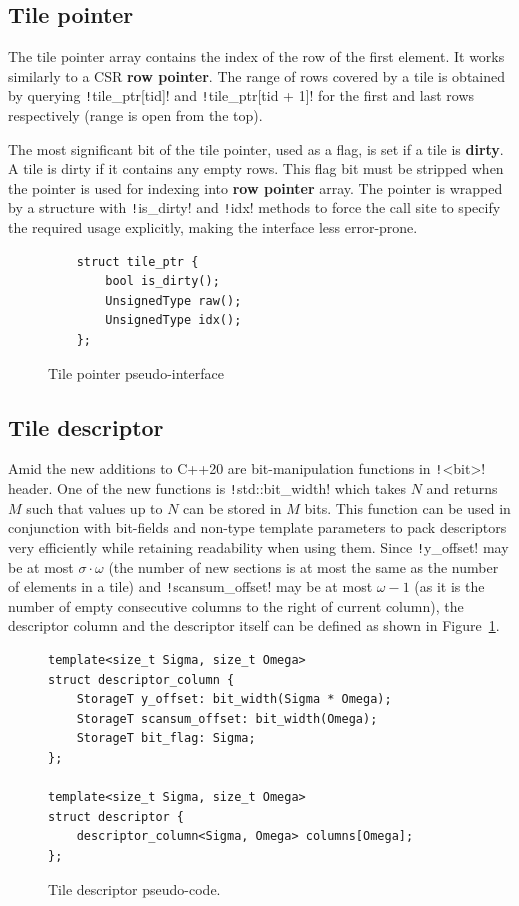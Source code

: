 \documentclass[thesis=M,english]{FITthesis}[2019/12/23]
\newcommand{\csre}[1]{\texttt!#1!}
\begin{document}
\subsection{Tile pointer}

The tile pointer array contains the index of the row of the first element. It works similarly to a CSR
\textbf{row pointer}. The range of rows covered by a tile is obtained by querying \csre{tile_ptr[tid]}
and \csre{tile_ptr[tid + 1]} for the first and last rows respectively (range is open from the top).

The most significant bit of the tile pointer, used as a flag, is set if a tile is \textbf{dirty}.
A tile is dirty if it contains any empty rows. This flag bit must be stripped when the pointer is used for
indexing into \textbf{row pointer} array. The pointer is wrapped by a structure with \csre{is_dirty} and
\csre{idx} methods to force the call site to specify the required usage explicitly, making the interface
less error-prone.

\begin{figure}[htp]
    \begin{verbatim}
    struct tile_ptr {
        bool is_dirty();
        UnsignedType raw(); 
        UnsignedType idx(); 
    };
    \end{verbatim}
    \caption{Tile pointer pseudo-interface}
\end{figure}



\subsection{Tile descriptor}

Amid the new additions to C++20 are bit-manipulation functions in \csre{<bit>} header.
One of the new functions is \csre{std::bit_width} which takes \(N\) and returns \(M\) such that values
up to \(N\) can be stored in \(M\) bits. This function can be used in conjunction with bit-fields
and non-type template parameters to pack descriptors very efficiently while retaining readability when using
them. Since \csre{y_offset} may be at most \(\sigma \cdot \omega\) (the number of new sections is at most the same
as the number of elements in a tile) and \csre{scansum_offset} may be at most \(\omega - 1\) (as it is the number
of empty consecutive columns to the right of current column), the descriptor column and the descriptor
itself can be defined as shown in Figure~\ref{csr5:tileDesc}.

\begin{figure}[htp]

    \begin{verbatim}
template<size_t Sigma, size_t Omega>
struct descriptor_column {
    StorageT y_offset: bit_width(Sigma * Omega);
    StorageT scansum_offset: bit_width(Omega);
    StorageT bit_flag: Sigma;
};

template<size_t Sigma, size_t Omega>
struct descriptor {
    descriptor_column<Sigma, Omega> columns[Omega];
};
    \end{verbatim}
    \caption{Tile descriptor pseudo-code.}\label{csr5:tileDesc}
\end{figure}
\end{document}
